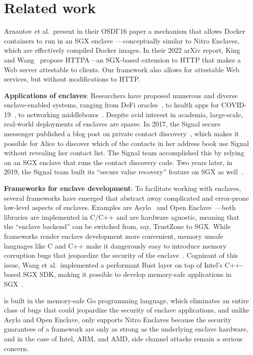 \section{Related work}%
\label{sec:related-work}

Arnautov et al.\ present in their OSDI'16 paper a mechanism that allows Docker
containers to run in an SGX enclave~\cite{Arnautov2016a}---conceptually similar
to Nitro Enclaves, which are effectively compiled Docker images.
%
In their 2022 arXiv report, King and Wang~\cite{King2022a} propose HTTPA---an
SGX-based extension to HTTP that makes a Web server attestable to clients.  Our
framework also allows for attestable Web services, but without modifications to
HTTP.

\textbf{Applications of enclaves}:
Researchers have proposed numerous and diverse enclave-enabled systems, ranging
from DeFi oracles~\cite{Zhang16a}, to health apps for
COVID-19~\cite{Mailthody21a}, to networking middleboxes~\cite{Han17a}.  Despite
avid interest in academia, large-scale, real-world deployments of enclaves are
sparse.  In 2017, the Signal secure messenger published a blog post on private
contact discovery~\cite{Marlinspike17a}, which makes it possible for Alice to
discover which of the contacts in her address book use Signal without revealing
her contact list.  The Signal team accomplished this by relying on an SGX
enclave that runs the contact discovery code.  Two years later, in 2019, the
Signal team built its ``secure value recovery'' feature on SGX as
well~\cite{Lund19a}.

\textbf{Frameworks for enclave development}:
To facilitate working with enclaves, several frameworks have emerged that
abstract away complicated and error-prone low-level aspects of enclaves.
Examples are Asylo~\cite{asylo} and Open Enclave~\cite{openenclave}---both
libraries are implemented in C/C++ and are hardware agnostic, meaning that the
``enclave backend'' can be switched from, say, TrustZone to SGX.  While
frameworks render enclave development more convenient, memory unsafe languages
like C and C++ make it dangerously easy to introduce memory corruption bugs
that jeopardize the security of the enclave~\cite{Lee2017a}.  Cognizant of
this issue, Wang et al.\ implemented a performant Rust layer on top of Intel's
C++-based SGX SDK, making it possible to develop memory-safe applications in
SGX~\cite{Wang2019a}.

\Tool{} is built in the memory-safe Go programming language, which
eliminates an entire class of bugs that could jeopardize the security of
enclave applications, and unlike Asylo and Open Enclave, \tool{} only
supports Nitro Enclaves because the security guarantees of a framework are only
as strong as the underlying enclave hardware, and in the case of Intel, ARM,
and AMD, side channel attacks remain a serious concern.

